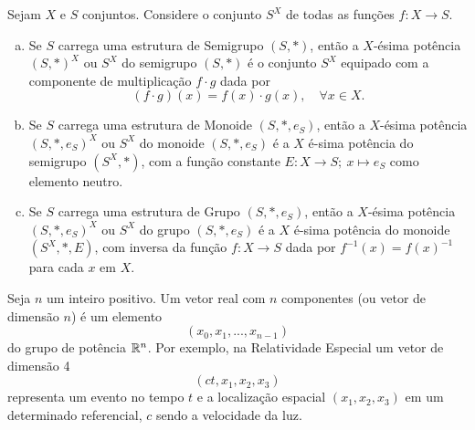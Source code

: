 \begin{definition}[Magma]
         \begin{definition}
            Sejam $X$ e $S$ conjuntos. Considere o conjunto $S^{X}$ de todas as funções $f: X\to S$.
            \begin{enumerate}[(a)]
               \item Se $S$ carrega uma estrutura de Semigrupo $(S,*)$, então a $X$-ésima potência $(S,*)^{X}$ ou $S^{X}$ do semigrupo $(S,*)$ é o conjunto $S^X$ equipado com a componente de multiplicação $f\cdot g$ dada por $$(f\cdot g)(x)=f(x)\cdot g(x), \quad \forall x \in X.$$
               \item Se $S$ carrega uma estrutura de Monoide $(S,*,e_{S})$, então a $X$-ésima potência $(S,*,e_{S})^{X}$ ou $S^X$ do monoide $(S,*,e_{S})$ é a $X$ é-sima potência do semigrupo $(S^X , *)$, com a função constante $E: X\to S;\ x\mapsto e_{S}$ como elemento neutro.
               \item Se $S$ carrega uma estrutura de Grupo $(S,*,e_{S})$, então a $X$-ésima potência $(S,*,e_{S})^X$ ou $S^X$ do grupo $(S,*,e_{S})$ é a $X$ é-sima potência do monoide $(S^X,*,E)$, com inversa da função $f: X\to S$ dada por $f^{-1}(x)=f(x)^{-1}$ para cada $x$ em $X$.
            \end{enumerate}
         \end{definition}
         \begin{exmp}[Vetores]
            Seja $n$ um inteiro positivo. Um vetor real com $n$ componentes (ou vetor de dimensão $n$) é um elemento
            $$(x_{0},x_{1},...,x_{n-1})$$
            do grupo de potência $\mathbb{R}^n$. Por exemplo, na Relatividade Especial um vetor de dimensão 4
            $$(ct,x_{1},x_{2},x_{3})$$
            representa um evento no tempo $t$ e a localização espacial $(x_{1},x_{2},x_{3})$ em um determinado referencial, $c$ sendo a velocidade da luz.
         \end{exmp}


\end{definition}
